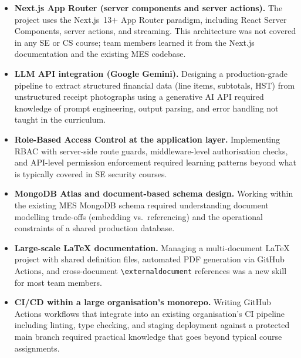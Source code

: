 \documentclass{article}
\begin{document}
\begin{itemize}
  \item \textbf{Next.js App Router (server components and server actions).}
    The project uses the Next.js~13$+$ App Router paradigm, including
    React Server Components, server actions, and streaming.  This
    architecture was not covered in any SE or CS course; team members
    learned it from the Next.js documentation and the existing MES codebase.
  \item \textbf{LLM API integration (Google Gemini).}  Designing a
    production-grade pipeline to extract structured financial data (line
    items, subtotals, HST) from unstructured receipt photographs using a
    generative AI API required knowledge of prompt engineering, output
    parsing, and error handling not taught in the curriculum.
  \item \textbf{Role-Based Access Control at the application layer.}
    Implementing RBAC with server-side route guards, middleware-level
    authorisation checks, and API-level permission enforcement required
    learning patterns beyond what is typically covered in SE security
    courses.
  \item \textbf{MongoDB Atlas and document-based schema design.}  Working
    within the existing MES MongoDB schema required understanding
    document modelling trade-offs (embedding vs.\ referencing) and the
    operational constraints of a shared production database.
  \item \textbf{Large-scale LaTeX documentation.}  Managing a
    multi-document LaTeX project with shared definition files, automated
    PDF generation via GitHub Actions, and cross-document
    \texttt{\textbackslash externaldocument} references was a new skill
    for most team members.
  \item \textbf{CI/CD within a large organisation's monorepo.}  Writing
    GitHub Actions workflows that integrate into an existing organisation's
    CI pipeline including linting, type checking, and staging deployment
    against a protected main branch required practical knowledge that
    goes beyond typical course assignments.
\end{itemize}
\end{document}
